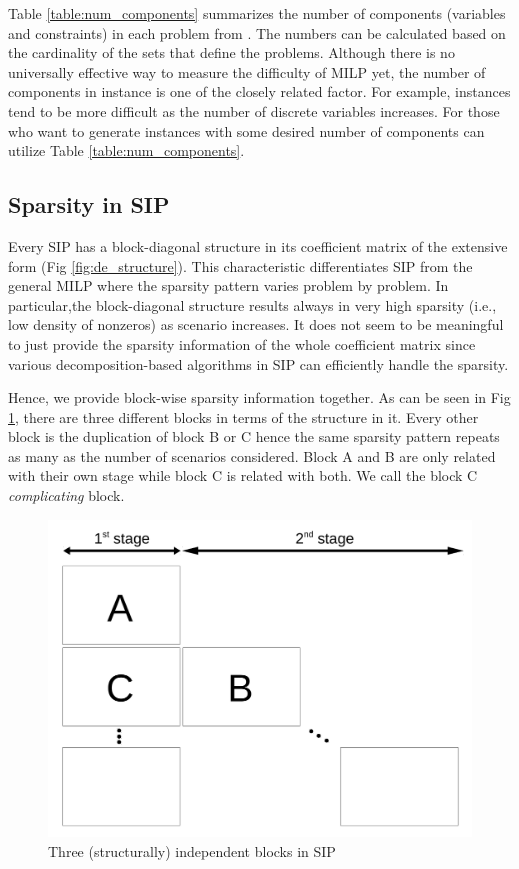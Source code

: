 Table \ref{table:num_components} summarizes the number of components (variables and constraints) in each problem from \siplibtwo. The numbers can be calculated based on the cardinality of the sets that define the problems. Although there is no universally effective way to measure the difficulty of MILP yet, the number of components in instance is one of the closely related factor. For example, instances tend to be more difficult as the number of discrete variables increases. For those who want to generate instances with some desired number of components can utilize Table \ref{table:num_components}.



\subsection{Sparsity in SIP}
Every SIP has a block-diagonal structure in its coefficient matrix of the extensive form (Fig \ref{fig:de_structure}). This characteristic differentiates SIP from the general MILP where the sparsity pattern varies problem by problem. In particular,the block-diagonal structure results always in very high sparsity (i.e., low density of nonzeros) as scenario increases. It does not seem to be meaningful to just provide the sparsity information of the whole coefficient matrix since various decomposition-based algorithms in SIP can efficiently handle the sparsity. 

Hence, we provide block-wise sparsity information together. As can be seen in Fig \ref{fig:stagewise_sparsity}, there are three different blocks in terms of the structure in it. Every other block is the duplication of block B or C hence the same sparsity pattern repeats as many as the number of scenarios considered. Block A and B are only related with their own stage while block C is related with both. We call the block C \textit{complicating} block. 



\begin{figure}
	\centering
	\includegraphics[width=0.7\linewidth]{drawings/stagewise_sparsity}
	\caption{Three (structurally) independent blocks in SIP}
	\label{fig:stagewise_sparsity}
\end{figure}







